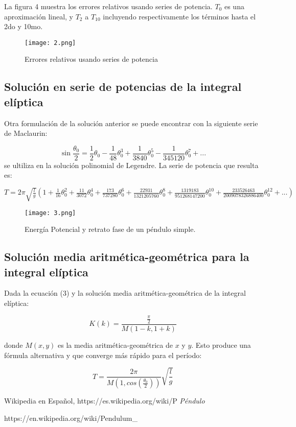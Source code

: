 \documentclass[12pt]{article}
\begin{document}
La figura 4 muestra los errores relativos usando series de potencia. $T_0$ es una aproximación lineal, y $T_2$ a $T_10$ incluyendo respectivamente los términos hasta el 2do y 10mo.

\begin{figure}[H]
	\centering
	\texttt{[image: 2.png]}
	\caption{Errores relativos usando series de potencia}
\end{figure}

\subsection{Solución en serie de potencias de la integral elíptica}
Otra formulación de la solución anterior se puede encontrar con la siguiente serie de Maclaurin:

$$\sin\frac{\theta_0}{2}=\frac{1}{2}\theta_0 - \frac{1}{48}\theta_0^3+\frac{1}{3840}\theta_0^5-\frac{1}{345120}\theta_0^7+...$$
se ultiliza en la solución polinomial de Legendre. La serie de potencia que resulta es:

$T=2\pi\sqrt{\frac{l}{g}}(1+\frac{1}{16}\theta_0^2+\frac{11}{3072}\theta_0^4+\frac{173}{737280}\theta_0^6+\frac{22931}{1321205760}\theta_0^8+\frac{1319183}{951268147200}\theta_0^{10}+\frac{233526463}{2009078326886400}\theta_0^{12}+...)$

\begin{figure}[H]
	\centering
	\texttt{[image: 3.png]}
	\caption{Energía Potencial y retrato fase de un péndulo simple.}
\end{figure}

\subsection{Solución media aritmética-geométrica para la integral elíptica}

Dada la ecuación (3) y la solución media aritmética-geométrica de la integral elíptica:

$$K(k)=\frac{\frac{\pi}{2}}{M(1-k,1+k)}$$

donde $M(x,y)$ es la  media aritmética-geométrica de $x$ y $y$.
Esto produce una fórmula alternativa y que converge más rápido para el período:

$$T=\frac{2\pi}{M(1,cos(\frac{\theta_0}{2}))}\sqrt{\frac{l}{g}}$$

\begin{thebibliography}{9}
	
Wikipedia en Español, https://es.wikipedia.org/wiki/P%
	\emph{Péndulo}
	
	https://en.wikipedia.org/wiki/Pendulum_%

   \bibitem{}	
\end{thebibliography}
\end{document}
